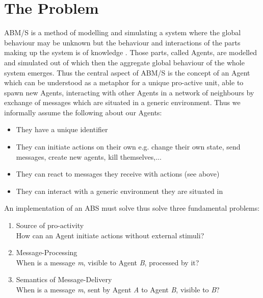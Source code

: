 \section{The Problem}

ABM/S is a method of modelling and simulating a system where the global behaviour may be unknown but the behaviour and interactions of the parts making up the system is of knowledge \cite{wooldridge_introduction_2009}. Those parts, called Agents, are modelled and simulated out of which then the aggregate global behaviour of the whole system emerges. Thus the central aspect of ABM/S is the concept of an Agent which can be understood as a metaphor for a unique pro-active unit, able to spawn new Agents, interacting with other Agents in a network of neighbours by exchange of messages which are situated in a generic environment. Thus we informally assume the following about our Agents:

\begin{itemize}
	\item They have a unique identifier
	\item They can initiate actions on their own e.g. change their own state, send messages, create new agents, kill themselves,...
	\item They can react to messages they receive with actions (see above)
	\item They can interact with a generic environment they are situated in
\end{itemize} 

An implementation of an ABS must solve thus solve three fundamental problems:
\begin{enumerate}
	\item Source of pro-activity \\ How can an Agent initiate actions without external stimuli?
	\item Message-Processing \\ When is a message \textit{m}, visible to Agent \textit{B}, processed by it?
	\item Semantics of Message-Delivery \\ When is a message \textit{m}, sent by Agent \textit{A} to Agent \textit{B}, visible to \textit{B}?
\end{enumerate}

